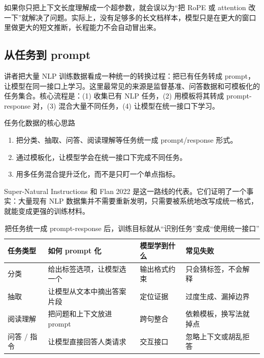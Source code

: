 \documentclass[a4paper]{article}
\begin{document}
如果你只把上下文长度理解成一个超参数，就会误以为“把 RoPE 或 attention 改一下”就解决了问题。实际上，没有足够多的长文档样本，模型只是在更大的窗口里做更大的短文推断，长程能力不会自动冒出来。

\subsection{从任务到 prompt}

讲者把大量 NLP 训练数据看成一种统一的转换过程：把已有任务转成 prompt，让模型在同一接口上学习。这里最常见的来源是监督基准、问答数据和可模板化的任务集合。核心流程是：(1) 收集已有 NLP 任务，(2) 用模板将其转成 prompt-response 对，(3) 混合大量不同任务，(4) 让模型在统一接口下学习。

\begin{importantbox}{任务化数据的核心思路}
\begin{enumerate}
    \item 把分类、抽取、问答、阅读理解等任务统一成 prompt/response 形式。
    \item 通过模板化，让模型学会在统一接口下完成不同任务。
    \item 用多任务混合提升泛化，而不是只盯一个单点指标。
\end{enumerate}
\end{importantbox}

Super-Natural Instructions 和 Flan 2022 是这一路线的代表。它们证明了一个事实：大量现有 NLP 数据集并不需要重新发明，只需要被系统地改写成统一格式，就能变成更强的训练材料。

\begin{table}[H]
\centering
\begin{tabular}{p{}p{}p{}p{}}
\toprule
\textbf{任务类型} & \textbf{如何 prompt 化} & \textbf{模型学到什么} & \textbf{常见失败} \\
\midrule
分类 & 给出标签选项，让模型选一个 & 输出格式约束 & 只会猜标签，不会解释 \\
抽取 & 让模型从文本中摘出答案片段 & 定位证据 & 过度生成、漏掉边界 \\
阅读理解 & 把问题和上下文放进 prompt & 跨句整合 & 依赖模板，换写法就掉点 \\
问答 / 指令 & 让模型直接回答人类请求 & 交互接口 & 忽略上下文或胡乱拒答 \\
\bottomrule
\end{tabular}
\caption{把任务统一成 prompt-response 后，训练目标就从“识别任务”变成“使用统一接口”}
\end{table}
\end{document}
